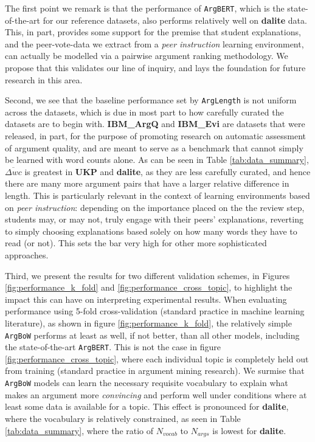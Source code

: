 \documentclass[runningheads]{llncs}
\begin{document}
The first point we remark is that the performance of \verb|ArgBERT|, which is 
the state-of-the-art for our reference datasets, also performs relatively well 
on \textbf{dalite} data.
This, in part, provides some support for the premise that student explanations, 
and the peer-vote-data we extract from a \textit{peer instruction} learning 
environment, can actually be modelled via a pairwise argument ranking 
methodology.
We propose that this validates our line of inquiry, and lays the foundation 
for future research in this area.

Second, we see that the baseline performance set by \verb|ArgLength| is 
not uniform across the datasets, which is due in most part to how carefully 
curated the datasets are to begin with.
\textbf{IBM\_ArgQ} and \textbf{IBM\_Evi} are datasets that were released, in 
part, for the purpose of promoting research on automatic assessment of argument 
quality, and are meant to serve as a benchmark that cannot simply be learned 
with word counts alone.   
As can be seen in Table \ref{tab:data_summary}, $\overline{\Delta wc}$ is 
greatest in \textbf{UKP} and \textbf{dalite}, as they are less carefully 
curated, 
and hence there are many more argument pairs that have a larger relative 
difference in length. 
This is particularly relevant in the context of learning environments based 
on \textit{peer instruction}: depending on the importance placed on the the 
review step, students may, or may not, truly engage with their peers' 
explanations, reverting to simply choosing explanations based solely on how 
many words they have to read (or not). 
This sets the bar very high for other more sophisticated approaches.

Third, we present the results for two different validation schemes, in Figures 
\ref{fig:performance_k_fold} and \ref{fig:performance_cross_topic}, to 
highlight the impact this can have on interpreting experimental results.
When evaluating performance using 5-fold cross-validation (standard practice in 
machine learning literature), as shown in figure \ref{fig:performance_k_fold}, 
the relatively simple \verb|ArgBoW| performs at least as well, if not better, 
than all other models, including the state-of-the-art \verb|ArgBERT|.
This is not the case in figure \ref{fig:performance_cross_topic}, where 
each individual topic is completely held out from training (standard practice 
in argument mining research).
We surmise that \verb|ArgBoW| models can learn the necessary requisite 
vocabulary to explain what makes an argument more \textit{convincing} and 
perform well under conditions where at least some data is available for a 
topic. 
This effect is pronounced for \textbf{dalite}, where the vocabulary is 
relatively constrained, as seen in Table \ref{tab:data_summary}, where the 
ratio of $N_{vocab}$ to $N_{args}$ is lowest for \textbf{dalite}. 
\end{document}
